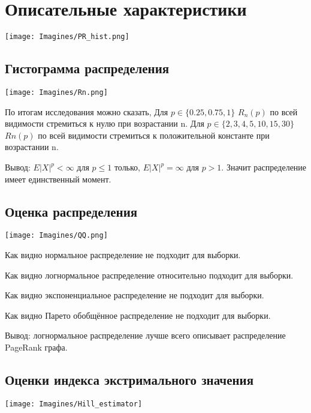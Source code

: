 \documentclass[reprint, amsmath, amssymb, aps,]{revtex4-2}
\begin{document}
\section{Описательные характеристики}

\begin{center}
\centering 
\texttt{[image: Imagines/PR\_hist.png]}
\end{center}


\subsection{Гистограмма распределения}

\begin{center}
\centering 
\texttt{[image: Imagines/Rn.png]}
\end{center}

По итогам исследования можно сказать, 
Для $p \in \lbrace 0.25, 0.75, 1 \rbrace $ $R_{n}(p)$ по всей видимости стремиться к нулю при возрастании n.
Для $p \in \lbrace 2, 3, 4, 5, 10, 15, 30 \rbrace $ $ Rn(p)$ по всей видимости стремиться к положительной константе при возрастании n.

Вывод: $E|X|^{p} < \infty$ для $p \leqslant 1$ только, $E|X|^{p} = \infty$ для $p > 1$.  Значит распределение имеет единственный момент.


\subsection{Оценка распределения}

\begin{center}
\centering 
\texttt{[image: Imagines/QQ.png]}
\end{center}
Как видно нормальное распределение не подходит для выборки.

Как видно логнормальное распределение относительно подходит для выборки.

Как видно экспоненциальное распределение не подходит для выборки.

Как видно Парето обобщённое распределение не подходит для выборки.

Вывод: логнормальное распределение лучше всего описывает распределение PageRank графа.


\subsection{Оценки индекса экстримального значения}
\begin{center}
\centering 
\texttt{[image: Imagines/Hill\_estimator]}
\end{center}
\end{document}
